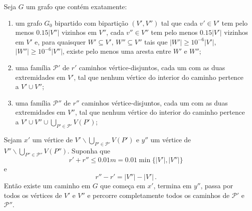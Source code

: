 \begin{lema}
	\label{lema:caminho_hamiltoniano}
	Seja $G$ um grafo que contém exatamente:
	\begin{enumerate}
		\item \label{item:regularidade}um grafo $G_0$ bipartido com bipartição $(V',V'')$ tal que cada $v'\in V'$ tem pelo menos $0.15|V''|$ vizinhos em $V''$, cada $v''\in V''$ tem pelo menos $0.15|V'|$ vizinhos em $V'$ e, para quaisquer $W'\subseteq V'$, $W''\subseteq V''$ tais que $|W'|\geq10^{-6}|V'|$, $|W''|\geq10^{-6}|V''|$, existe pelo menos uma aresta entre $W'$ e $W''$;
		\item uma família $\mathcal{P}'$ de $r'$ caminhos vértice-disjuntos, cada um com as duas extremidades em $V'$, tal que nenhum vértice do interior do caminho pertence a $V'\cup V''$;
		\item uma família $\mathcal{P}''$ de $r''$ caminhos vértice-disjuntos, cada um com as duas extremidades em $V''$, tal que nenhum vértice do interior do caminho pertence a $V'\cup V''\cup \bigcup_{P'\in \mathcal{P}'}V(P')$;
	\end{enumerate}
	Sejam $x'$ um vértice de $V'\backslash \bigcup_{P'\in \mathcal{P}'}V(P')$ e $y''$ um vértice de $V''\backslash \bigcup_{P''\in \mathcal{P}''}V(P'')$. Suponha que 
	\[
	r' + r''\leq 0.01m = 0.01\min\{|V'|, |V''|\}
	\]
	e 
	\[
	r'' - r' = |V''| - |V'|\,. 
	\]
	Então existe um caminho em $G$ que começa em $x'$, termina em $y''$, passa por todos os vértices de $V'$ e $V''$ e percorre completamente todos os caminhos de $\mathcal{P}'$ e $\mathcal{P}''$. 
\end{lema}

